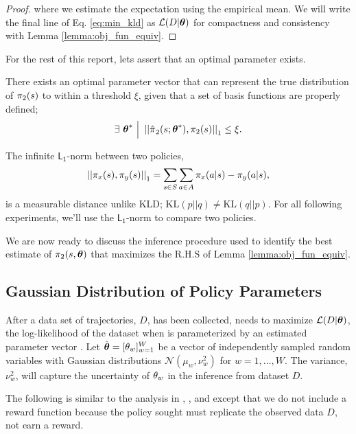 \begin{proof}
        \noindent
        where we estimate the expectation using the empirical mean. We will write the final line of Eq.
        \ref{eq:min_kld} as $\mathcal{L}(D|\boldsymbol{\mathbb{\theta}})$ for compactness and consistency with Lemma
        \ref{lemma:obj_fun_equiv}.

    \end{proof}

    For the rest of this report, lets assert that an optimal parameter exists.
    \begin{assumption}\label{assump:opt_policy_err}
        There exists an optimal parameter vector that can represent the true distribution of $\pi_{2}(s)$ to within a
        threshold $\xi$, given that a set of basis functions are properly defined;
        \[
            \exists\ \optimal{\paramVec}\ \Big|\  \OneNorm{\estimate{\policy{}}_2(s;\optimal{\paramVec}),\policy{2}(s)}
                \leq \xi.
        \]
    \end{assumption}

    \noindent
    The infinite $\mathsf{L_1}$-norm between two policies,
    \[
        \left|\left|\pi_{x}(s),\pi_{y}(s)\right|\right|_1 = \sum_{s \in S}\sum_{a \in A}\pi_{x}(a|s)-\pi_{y}(a|s),
    \]
    is a measurable distance unlike \ac{KLD}; $\text{KL}(p||q) \neq \text{KL}(q||p)$. For all following experiments,
    we'll use the $\mathsf{L_1}$-norm to compare two policies.

    We are now ready to discuss the inference procedure used to identify the best estimate of $\pi_{2}(s, \boldsymbol{\mathbb{\theta}})$
    that maximizes the R.H.S of Lemma \ref{lemma:obj_fun_equiv}.


\subsection{Gaussian Distribution of Policy Parameters}\label{sec:gauss_policy}

    After a data set of trajectories, $D$, has been collected,  needs to maximize $\mathcal{L}(D|\boldsymbol{\mathbb{\theta}})$, the
    log-likelihood of the dataset when  is parameterized by an estimated parameter vector
    \estimate{\paramVec}. Let $\hat{\boldsymbol{\mathbb{\theta}}} = [ \theta_{w}]_{w=1}^W$ be a vector of independently sampled random
    variables with Gaussian distributions $\mathcal{N}(\mu_w, \nu_w^2)$ for $w=1,\ldots,W$. The variance, $\nu_w^2$,
    will capture the uncertainty of $\theta_{w}$ in the inference from dataset $D$.

    The following is similar to the analysis in \cite{tangkaratt2014model}, \cite{herman2016inverse}, and
    \cite{sehnke2010parameter} except that we do not include a reward function because the policy sought must replicate
    the observed data $D$, not earn a reward.

